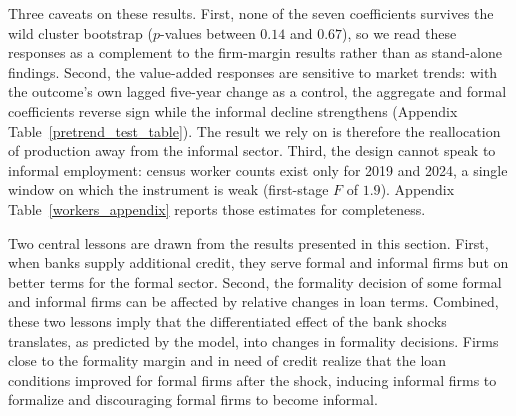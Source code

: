 \documentclass[12pt]{article}
\begin{document}
\begin{table}[H]
    \caption{Shift-Share IV estimates of the effect of bank shocks on workers, wagebill, and value added}
    \label{main_econ_table}
    \centering
    \small
    
\end{table}

Three caveats on these results. First, none of the seven coefficients survives the wild cluster bootstrap ($p$-values between $0.14$ and $0.67$), so we read these responses as a complement to the firm-margin results rather than as stand-alone findings. Second, the value-added responses are sensitive to market trends: with the outcome's own lagged five-year change as a control, the aggregate and formal coefficients reverse sign while the informal decline strengthens (Appendix Table~\ref{pretrend_test_table}). The result we rely on is therefore the reallocation of production away from the informal sector. Third, the design cannot speak to informal employment: census worker counts exist only for 2019 and 2024, a single window on which the instrument is weak (first-stage $F$ of $1.9$). Appendix Table~\ref{workers_appendix} reports those estimates for completeness.





Two central lessons are drawn from the results presented in this section. First, when banks supply additional credit, they serve formal and informal firms but on better terms for the formal sector. Second, the formality decision of some formal and informal firms can be affected by relative changes in loan terms. Combined, these two lessons imply that the differentiated effect of the bank shocks translates, as predicted by the model, into changes in formality decisions. Firms close to the formality margin and in need of credit realize that the loan conditions improved for formal firms after the shock, inducing informal firms to formalize and discouraging formal firms to become informal.
\end{document}
